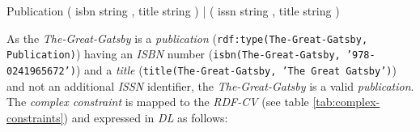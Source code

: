 \documentclass{llncs}
\newcommand{\ms}[1]{\texttt{#1}}
\newenvironment{DL}{
  \vspace{0cm}
	\begin{center}
  \begin{tabular}{r l}

}{
  \end{tabular}
	\end{center}
}
\begin{document}
{%


\begin{ex}
Publication { 
    ( isbn string , title string ) |
    ( issn string , title string ) }
\end{ex}



As the \emph{The-Great-Gatsby} is a \emph{publication} (\ms{rdf:type(The-Great-Gatsby, Publication)}) having an \emph{ISBN} number (\ms{isbn(The-Great-Gatsby, '978-0241965672')}) and a \emph{title} (\ms{title(The-Great-Gatsby, 'The Great Gatsby')}) and not an additional \emph{ISSN} identifier, the \emph{The-Great-Gatsby} is a valid \emph{publication}.
The \emph{complex constraint} is mapped to the \emph{RDF-CV} (see table \ref{tab:complex-constraints}) and expressed in \emph{DL} as follows:


}
\end{document}
